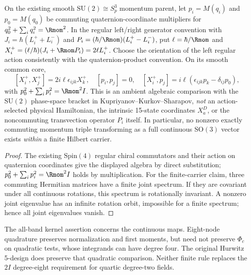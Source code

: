 \documentclass[11pt,a4paper]{article}
\begin{document}
\begin{proposition}
\label{p2c:prop:v340-s3lit-chiral-algebra}
On the existing smooth $\mathrm{SU}(2)\cong S^3_p$ momentum parent,
let $p_i=M(q_i)$ and $p_0=M(q_0)$ be commuting quaternion-coordinate
multipliers for $q_0^2+\sum_iq_i^2=\Rmom^2$.
In the regular left/right generator convention with
$J_i=\hbar(L_i^++L_i^-)$ and
$P_i=(\hbar/\Rmom)(L_i^+-L_i^-)$, put
$\ell=\hbar/\Rmom$ and
$X_i^+=(\ell/\hbar)(J_i+\Rmom P_i)=2\ell L_i^+$.
Choose the orientation of the left regular action consistently with
the quaternion-product convention.  On its smooth common core,
\[
 [X_i^+,X_j^+]=2i\ell\epsilon_{ijk}X_k^+,
 \quad[p_i,p_j]=0,
 \quad[X_i^+,p_j]=i\ell(\epsilon_{ijk}p_k-\delta_{ij}p_0),
\]
with $p_0^2+\sum_ip_i^2=\Rmom^2I$.  This is an ambient
algebraic comparison with the $\mathrm{SU}(2)$ phase-space bracket in
Kupriyanov--Kurkov--Sharapov, \emph{not} an action-selected physical
Hamiltonian, the intrinsic 15-state coordinates $X_a^D$, or the
noncommuting transvection operator $P_i$ itself.  In particular, no
nonzero exactly commuting momentum triple transforming as a full
continuous $\mathrm{SO}(3)$ vector exists \emph{within} a finite
Hilbert carrier.
\end{proposition}
\begin{proof}
The existing $\mathrm{Spin}(4)$ regular chiral commutators and their
action on quaternion coordinates give the displayed algebra by direct
substitution; $p_0^2+\sum_i p_i^2=\Rmom^2I$ holds by multiplication.
For the finite-carrier claim, three commuting Hermitian matrices have
a finite joint spectrum.  If they are covariant under all continuous
rotations, this spectrum is rotationally invariant.  A nonzero joint
eigenvalue has an infinite rotation orbit, impossible for a finite
spectrum; hence all joint eigenvalues vanish.
\end{proof}


The all-band kernel assertion concerns the continuous maps.
Eight-node quadrature preserves normalization and first moments,
but need not preserve \(\Phi_c\) on quadratic tests, whose
integrands can have degree four. The original Hurwitz 5-design
does preserve that quadratic comparison. Neither finite rule
replaces the \(2I\) degree-eight requirement for quartic
degree-two fields.
\end{document}
